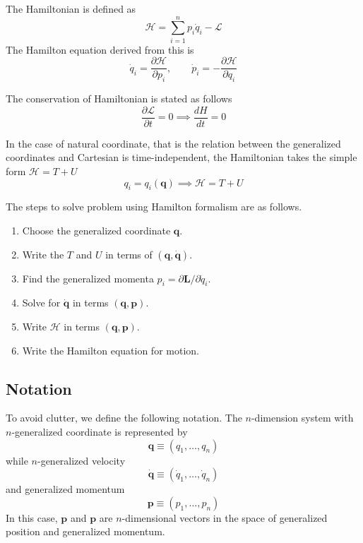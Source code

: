 \documentclass[../../../main.tex]{subfiles}
\begin{document}
The Hamiltonian is defined as
\begin{equation*}
	\mathcal{H}=\sum_{i=1}^{n}p_i\dot{q}_i-\mathcal{L}
\end{equation*}
The Hamilton equation derived from this is
\begin{equation*}
	\dot{q}_i=\frac{\partial\mathcal{H}}{\partial p_i},\qquad\dot{p}_i=-\frac{\partial\mathcal{H}}{\partial q_i}
\end{equation*}

The conservation of Hamiltonian is stated as follows
\begin{equation*}
	\frac{\partial\mathcal{L}}{\partial t}=0\implies\frac{dH}{dt}=0
\end{equation*}

In the case of natural coordinate, that is the relation between the generalized coordinates and Cartesian is time-independent, the Hamiltonian takes the simple form $\mathcal{H}=T+U$
\begin{equation*}
	q_i=q_i(\mathbf{q})\implies\mathcal{H}=T+U
\end{equation*}

The steps to solve problem using Hamilton formalism are as follows.
\begin{enumerate}
    \item Choose the generalized coordinate $\mathbf{q}$.
    \item Write the $T$ and $U$ in terms of $(\mathbf{q},\dot{\mathbf{q}})$.
    \item Find the generalized momenta $p_i=\partial\mathbf{L}/\partial \dot{q}_i$.
    \item Solve for $\dot{\mathbf{q}}$ in terms $(\mathbf{q},\mathbf{p})$.
    \item Write $\mathcal{H}$ in terms $(\mathbf{q},\mathbf{p})$.
    \item Write the Hamilton equation for motion.
\end{enumerate}

\subsection*{Notation}
To avoid clutter, we define the following notation.
The $n$-dimension system with $n$-generalized coordinate is represented by
\begin{equation*}
	\mathbf{q}\equiv(q_1,\dots,q_n)
\end{equation*}
while $n$-generalized velocity
\begin{equation*}
	\dot{\mathbf{q}}\equiv(\dot{q}_1,\dots,\dot{q}_n)
\end{equation*}
and generalized momentum
\begin{equation*}
	\mathbf{p}\equiv(p_1,\dots,p_n)
\end{equation*}
In this case, $\mathbf{p}$ and $\mathbf{p}$ are $n$-dimensional vectors in the space of generalized position and generalized momentum.
\end{document}
